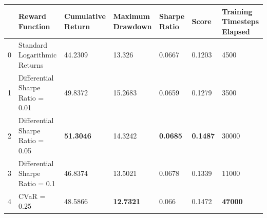 \begin{tabular}{lllllll}
\toprule
 & Reward Function & Cumulative Return & Maximum Drawdown & Sharpe Ratio & Score & Training Timesteps Elapsed \\
\midrule
0 & Standard Logarithmic Returns & 44.2309 & 13.326 & 0.0667 & 0.1203 & 4500 \\
1 & Differential Sharpe Ratio = 0.01 & 49.8372 & 15.2683 & 0.0659 & 0.1279 & 3500 \\
2 & Differential Sharpe Ratio = 0.05 & \textbf{51.3046} & 14.3242 & \textbf{0.0685} & \textbf{0.1487} & 30000 \\
3 & Differential Sharpe Ratio = 0.1 & 46.8374 & 13.5021 & 0.0678 & 0.1339 & 11000 \\
4 & CVaR = 0.25 & 48.5866 & \textbf{12.7321} & 0.066 & 0.1472 & \textbf{47000} \\
\bottomrule
\end{tabular}
